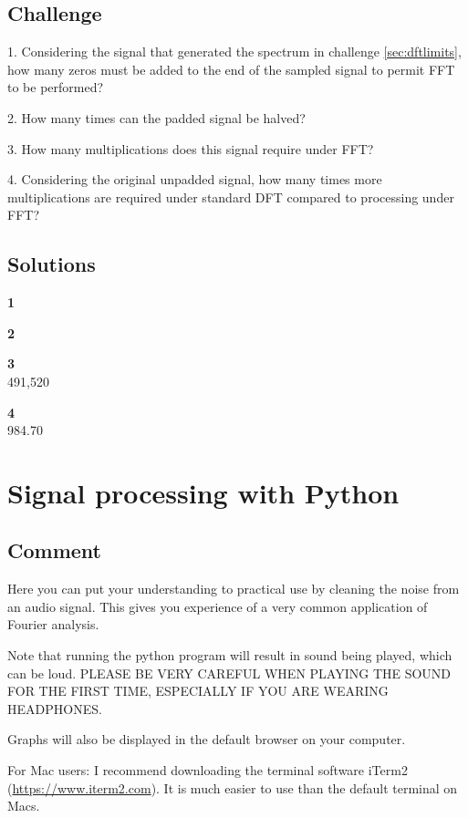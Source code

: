 \subsection*{Challenge}
1. Considering the signal that generated the spectrum in challenge \ref{sec:dftlimits}, how many zeros must be added to the end of the sampled signal to permit FFT to be performed?

2. How many times can the padded signal be halved?

3. How many multiplications does this signal require under FFT?

4. Considering the original unpadded signal, how many times more multiplications are required under standard DFT compared to processing under FFT?

\subsection*{Solutions}
\textbf{1}\\

\textbf{2}\\

\textbf{3}\\
491,520

\textbf{4}\\
984.70




\newpage
\section{Signal processing with Python}

\subsection*{Comment}
Here you can put your understanding to practical use by cleaning the noise from an audio signal. This gives you experience of a very common application of Fourier analysis.

Note that running the python program will result in sound being played, which can be loud. PLEASE BE VERY CAREFUL WHEN PLAYING THE SOUND FOR THE FIRST TIME, ESPECIALLY IF YOU ARE WEARING HEADPHONES.

Graphs will also be displayed in the default browser on your computer.

For Mac users: I recommend downloading the terminal software iTerm2 (\url{https://www.iterm2.com}). It is much easier to use than the default terminal on Macs.

